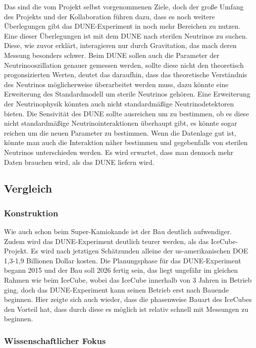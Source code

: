 Das sind die vom Projekt selbst vorgenommenen Ziele, doch der große Umfang des Projekts und der Kollaboration führen dazu, dass
es noch weitere Überlegungen gibt das DUNE-Experiment in noch mehr Bereichen zu nutzen. 
Eine dieser Überlegungen ist mit dem DUNE nach sterilen Neutrinos zu suchen. Diese, wie zuvor erklärt, interagieren nur
durch Gravitation, das mach deren Messung besonders schwer. Beim DUNE sollen auch die Parameter der Neutrinooszillation
genauer gemessen werden, sollte diese nicht den theoretisch progonsizierten Werten, deutet das daraufhin, dass
das theoretische Verständnis des Neutrinos möglicherweise überarbeitet werden muss, dazu könnte eine Erweiterung
des Standardmodell um sterile Neutrinos gehören.\cite{Berryman2015}
Eine Erweiterung der Neutrinophysik könnten auch nicht standardmäßige Neutrinodetektoren bieten. Die Sensivität des DUNE sollte
ausreichen um zu bestimmen, ob es diese nicht standardmäßige Neutrinointeraktionen überhaupt gibt, es könnte
sogar reichen um die neuen Parameter zu bestimmen. Wenn die Datenlage gut ist, könnte man auch die Interaktion
näher bestimmen und gegebenfalls von sterilen Neutrinos unterschieden werden. Es wird erwartet, dass man
dennoch mehr Daten brauchen wird, als das DUNE liefern wird. \cite{Gouvea2016}

\subsection{Vergleich}

\subsubsection{Konstruktion}

Wie auch schon beim Super-Kamiokande ist der Bau deutlich aufwendiger. Zudem wird das DUNE-Experiment deutlich teurer
werden, als das IceCube-Projekt. Es wird nach jetztigen Schätzunden alleine der us-amerikanischen DOE 1,3-1,9 Billionen
Dollar kosten. 
Die Planungsphase für das DUNE-Experiment begann 2015 und der Bau soll 2026 fertig sein, das liegt ungefähr im gleichen
Rahmen wie beim IceCube, wobei das IceCube innerhalb von 3 Jahren in Betrieb ging, doch das DUNE-Experiment kann seinen Betrieb
erst nach Bauende beginnen. Hier zeigte sich auch wieder, dass die phasenweise Bauart des IceCubes den Vorteil hat, dass durch
diese es möglich ist relativ schnell mit Messungen zu beginnen.

\subsubsection{Wissenschaftlicher Fokus}

